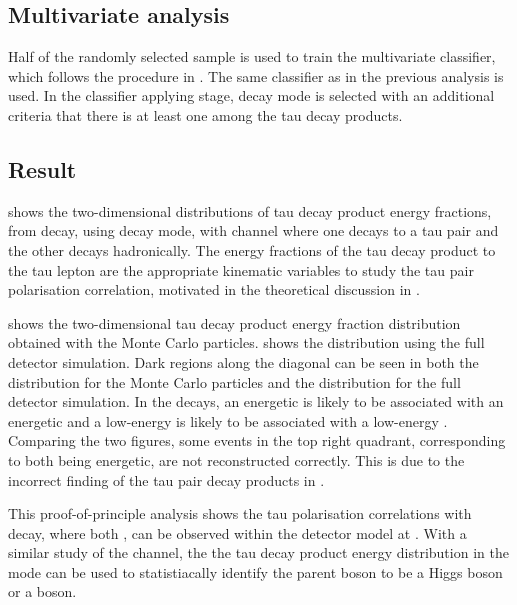 \subsection{Multivariate analysis}

Half of the randomly selected sample is used to train the multivariate classifier,  which follows the procedure in  . The same classifier as in the previous analysis  is used.   In the classifier applying stage, \tauToPion decay mode is selected with an additional criteria that there is at least one \Ppipm among the tau decay products.

\subsection{Result}

 shows the two-dimensional distributions of  tau decay product energy fractions, from \ZToTauTau decay,  using \tauToPion decay mode, with \eeZZ channel where one \PZ decays to a tau pair and the other \PZ decays hadronically. The energy fractions of the tau decay product to the tau lepton are the appropriate kinematic variables to study the tau pair polarisation correlation, motivated in the theoretical discussion in .

 shows the  two-dimensional  tau decay product energy fraction distribution obtained with the Monte Carlo particles.  shows the distribution using the full detector simulation. Dark regions along the diagonal can be seen in both the distribution for the Monte Carlo particles and the distribution for the full detector simulation. In the \ZToTauTau decays, an energetic \Pgppm is likely to be associated with an energetic \Pgpmp and a low-energy \Pgppm is  likely to be associated with a low-energy \Pgpmp. Comparing the two figures, some events in the top right quadrant, corresponding to  both \Ppipm being energetic, are not reconstructed correctly. This is due to the incorrect finding of the tau pair decay products  in .


This proof-of-principle analysis shows the tau polarisation correlations with \ZToTauTau decay, where both \tauToPion, can be observed within the \ILD detector model at  . With a similar study of the \HiggsToTauTau channel,  the  the tau decay product energy distribution in the \tauToPion mode can be used to statistiacally identify the parent boson to be a Higgs boson or a \PZ boson.

